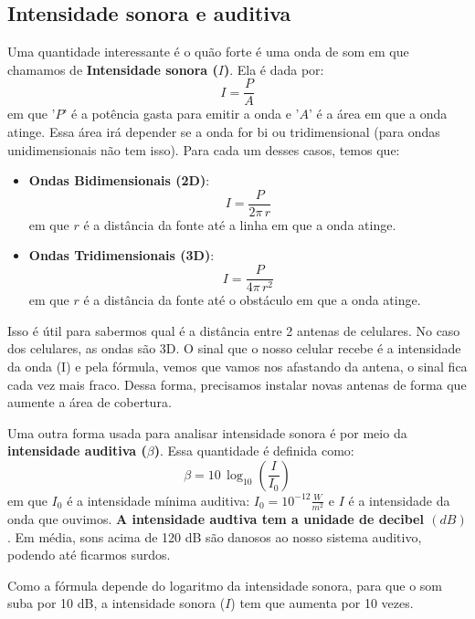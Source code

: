 \documentclass[12pt]{extarticle}
\newcommand{\<}{\langle}
\renewcommand{\>}{\rangle}
\theoremstyle{definition}
\begin{document}
\subsection{Intensidade sonora e auditiva}
Uma quantidade interessante é o quão forte é uma onda de som em que chamamos de \textbf{Intensidade sonora ($I$)}. Ela é dada por:
\begin{equation}
    I= \frac{P}{A}
\end{equation}
\noindent em que '$P$' é a potência gasta para emitir a onda e '$A$' é a área em que a onda atinge. Essa área irá depender se a onda for bi ou tridimensional (para ondas unidimensionais não tem isso). Para cada um desses casos, temos que:
\begin{itemize}
    \item \textbf{Ondas Bidimensionais (2D)}:
    \begin{equation}
        I = \frac{P}{2\pi\,r}
    \end{equation}
    \noindent em que $r$ é a distância da fonte até a linha em que a onda atinge.
    
    \item \textbf{Ondas Tridimensionais (3D)}:
    \begin{equation}
        I=\frac{P}{4\pi\,r^2}
    \end{equation}
    \noindent em que $r$ é a distância da fonte até o obstáculo em que a onda atinge.
\end{itemize}
Isso é útil para sabermos qual é a distância entre 2 antenas de celulares. No caso dos celulares, as ondas são 3D. O sinal que o nosso celular recebe é a intensidade da onda (I) e pela fórmula, vemos que vamos nos afastando da antena, o sinal fica cada vez mais fraco. Dessa forma, precisamos instalar novas antenas de forma que aumente a área de cobertura.

Uma outra forma usada para analisar intensidade sonora é por meio da \textbf{intensidade auditiva ($\beta$)}. Essa quantidade é definida como:
\begin{equation}
    \beta = 10\,\log_{10}\left(\frac{I}{I_0}\right)
\end{equation}
\noindent em que $I_0$ é a intensidade mínima auditiva: $I_0 = 10^{-12}\frac{W}{m^2}$ e $I$ é a intensidade da onda que ouvimos. \textbf{A intensidade audtiva tem a unidade de decibel $(dB)$}. Em média, sons acima de 120 dB são danosos ao nosso sistema auditivo, podendo até ficarmos surdos. 

Como a fórmula depende do logaritmo da intensidade sonora, para que o som suba por 10 dB, a intensidade sonora ($I$) tem que aumenta por 10 vezes.
\end{document}
